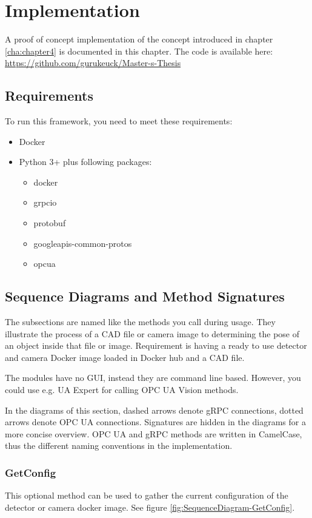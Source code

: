\chapter{Implementation\label{cha:chapter5}}
A proof of concept implementation of the concept introduced in chapter \ref{cha:chapter4} is documented in this chapter. The code is available here: \url{https://github.com/gurukeuck/Master-s-Thesis}

\section{Requirements}
To run this framework, you need to meet these requirements:
\begin{itemize}
    \item Docker
    \item Python 3+ plus following packages:
    \begin{itemize}
        \item docker
        \item grpcio
        \item protobuf
        \item googleapis-common-protos
        \item opcua
    \end{itemize}
\end{itemize}

\section{Sequence Diagrams and Method Signatures}
The subsections are named like the methods you call during usage. They illustrate the process of a CAD file or camera image to determining the pose of an object inside that file or image. Requirement is having a ready to use detector and camera Docker image loaded in Docker hub and a CAD file. 

The modules have no GUI, instead they are command line based. However, you could use e.g. UA Expert for calling OPC UA Vision methods.

In the diagrams of this section, dashed arrows denote gRPC connections, dotted arrows denote OPC UA connections. Signatures are hidden in the diagrams for a more concise overview. OPC UA and gRPC methods are written in CamelCase, thus the different naming conventions in the implementation.

\subsection{GetConfig}\label{subsec:getconfig}
This optional method can be used to gather the current configuration of the detector or camera docker image. See figure \ref{fig:SequenceDiagram-GetConfig}.

